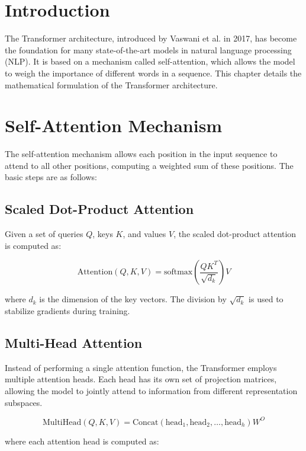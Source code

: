 \section{Introduction}
The Transformer architecture, introduced by Vaswani et al. in 2017, has become the foundation for many state-of-the-art models in natural language processing (NLP). It is based on a mechanism called self-attention, which allows the model to weigh the importance of different words in a sequence. This chapter details the mathematical formulation of the Transformer architecture.

\section{Self-Attention Mechanism}

The self-attention mechanism allows each position in the input sequence to attend to all other positions, computing a weighted sum of these positions. The basic steps are as follows:

\subsection{Scaled Dot-Product Attention}
Given a set of queries \( Q \), keys \( K \), and values \( V \), the scaled dot-product attention is computed as:

\begin{equation}
\text{Attention}(Q, K, V) = \text{softmax}\left( \frac{QK^T}{\sqrt{d_k}} \right) V
\end{equation}

where \( d_k \) is the dimension of the key vectors. The division by \( \sqrt{d_k} \) is used to stabilize gradients during training.

\subsection{Multi-Head Attention}
Instead of performing a single attention function, the Transformer employs multiple attention heads. Each head has its own set of projection matrices, allowing the model to jointly attend to information from different representation subspaces.

\begin{equation}
\text{MultiHead}(Q, K, V) = \text{Concat}(\text{head}_1, \text{head}_2, \ldots, \text{head}_h)W^O
\end{equation}

where each attention head is computed as:

